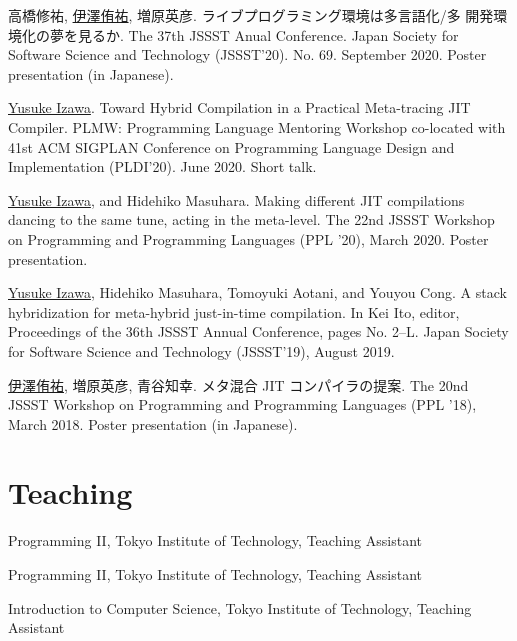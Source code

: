 \documentclass[11pt]{article} %
\newcommand{\YusukeIzawa}{\underline{Yusuke Izawa}}
\newcommand{\伊澤侑祐}{\underline{伊澤侑祐}}
\newcommand{\jit}{\textsc{JIT} }
\begin{document}
 高橋修祐, \伊澤侑祐, 増原英彦. ライブプログラミング環境は多言語化/多
開発環境化の夢を見るか. The 37th JSSST Anual Conference. Japan Society for
Software Science and Technology (JSSST'20). No. 69. September 2020. Poster
presentation (in Japanese).
\medskip

 \YusukeIzawa. Toward Hybrid Compilation in a Practical Meta-tracing
\jit Compiler. PLMW: Programming Language Mentoring Workshop co-located with 41st
ACM SIGPLAN Conference on Programming Language Design and Implementation
(PLDI'20). June 2020. Short talk.
\medskip

 \YusukeIzawa, and Hidehiko Masuhara. Making different \jit
compilations dancing to the same tune, acting in the meta-level. The 22nd JSSST
Workshop on Programming and Programming Languages (PPL '20), March 2020. Poster
presentation.
\medskip

 \YusukeIzawa, Hidehiko Masuhara, Tomoyuki Aotani, and Youyou
Cong. A stack hybridization for meta-hybrid just-in-time compilation. In Kei
Ito, editor, Proceedings of the 36th JSSST Annual Conference, pages
No. 2–L. Japan Society for Software Science and Technology (JSSST'19), August
2019.
\medskip


 \伊澤侑祐, 増原英彦, 青谷知幸. メタ混合 \jit コンパイラの提案. The
20nd JSSST Workshop on Programming and Programming Languages (PPL '18), March
2018. Poster presentation (in Japanese).
\medskip


\section*{Teaching}

 Programming II, Tokyo Institute of Technology, Teaching Assistant

 Programming II, Tokyo Institute of Technology, Teaching Assistant

 Introduction to Computer Science, Tokyo Institute of Technology, Teaching Assistant
\end{document}
